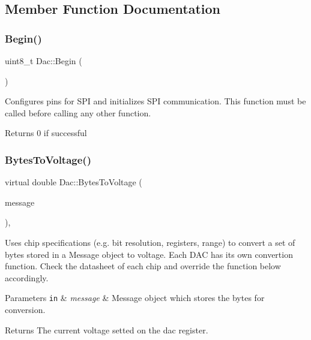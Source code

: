 \subsection{Member Function Documentation}
\mbox{\label{classDac_a342bb811b205d50baacb3211e89ea062}} 
\subsubsection{\texorpdfstring{Begin()}{Begin()}}
{\footnotesize\ttfamily uint8\+\_\+t Dac\+::\+Begin (\begin{DoxyParamCaption}\item[{void}]{ }\end{DoxyParamCaption})}

Configures pins for S\+PI and initializes S\+PI communication. This function must be called before calling any other function. \begin{DoxyReturn}{Returns}
0 if successful 
\end{DoxyReturn}
\mbox{\label{classDac_a1df39dc8c6e5b50afd07b6dd8a6b9300}} 
\subsubsection{\texorpdfstring{Bytes\+To\+Voltage()}{BytesToVoltage()}}
{\footnotesize\ttfamily virtual double Dac\+::\+Bytes\+To\+Voltage (\begin{DoxyParamCaption}\item[{\mbox{\hyperlink{structspi__utils_1_1Message}{spi\+\_\+utils\+::\+Message}}}]{message }\end{DoxyParamCaption})\hspace{0.3cm}{\ttfamily [protected]}, {}}

Uses chip specifications (e.\+g. bit resolution, registers, range) to convert a set of bytes stored in a Message object to voltage. Each D\+AC has its own convertion function. Check the datasheet of each chip and override the function below accordingly. 
\begin{DoxyParams}[1]{Parameters}
\mbox{\tt in}  & {\em message} & Message object which stores the bytes for conversion. \\
\hline
\end{DoxyParams}
\begin{DoxyReturn}{Returns}
The current voltage setted on the dac register. 
\end{DoxyReturn}


